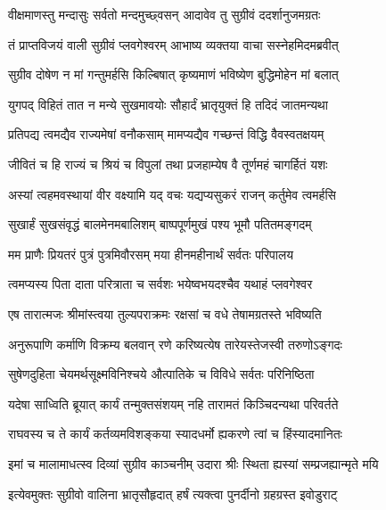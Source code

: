 
\twolineshloka
{वीक्षमाणस्तु मन्दासुः सर्वतो मन्दमुच्छ्वसन्}
{आदावेव तु सुग्रीवं ददर्शानुजमग्रतः} %

\twolineshloka
{तं प्राप्तविजयं वाली सुग्रीवं प्लवगेश्वरम्}
{आभाष्य व्यक्तया वाचा सस्नेहमिदमब्रवीत्} %

\twolineshloka
{सुग्रीव दोषेण न मां गन्तुमर्हसि किल्बिषात्}
{कृष्यमाणं भविष्येण बुद्धिमोहेन मां बलात्} %

\twolineshloka
{युगपद् विहितं तात न मन्ये सुखमावयोः}
{सौहार्दं भ्रातृयुक्तं हि तदिदं जातमन्यथा} %

\twolineshloka
{प्रतिपद्य त्वमद्यैव राज्यमेषां वनौकसाम्}
{मामप्यद्यैव गच्छन्तं विद्धि वैवस्वतक्षयम्} %

\twolineshloka
{जीवितं च हि राज्यं च श्रियं च विपुलां तथा}
{प्रजहाम्येष वै तूर्णमहं चागर्हितं यशः} %

\twolineshloka
{अस्यां त्वहमवस्थायां वीर वक्ष्यामि यद् वचः}
{यद्यप्यसुकरं राजन् कर्तुमेव त्वमर्हसि} %

\twolineshloka
{सुखार्हं सुखसंवृद्धं बालमेनमबालिशम्}
{बाष्पपूर्णमुखं पश्य भूमौ पतितमङ्गदम्} %

\twolineshloka
{मम प्राणैः प्रियतरं पुत्रं पुत्रमिवौरसम्}
{मया हीनमहीनार्थं सर्वतः परिपालय} %

\twolineshloka
{त्वमप्यस्य पिता दाता परित्राता च सर्वशः}
{भयेष्वभयदश्चैव यथाहं प्लवगेश्वर} %

\twolineshloka
{एष तारात्मजः श्रीमांस्त्वया तुल्यपराक्रमः}
{रक्षसां च वधे तेषामग्रतस्ते भविष्यति} %

\twolineshloka
{अनुरूपाणि कर्माणि विक्रम्य बलवान् रणे}
{करिष्यत्येष तारेयस्तेजस्वी तरुणोऽङ्गदः} %

\twolineshloka
{सुषेणदुहिता चेयमर्थसूक्ष्मविनिश्चये}
{औत्पातिके च विविधे सर्वतः परिनिष्ठिता} %

\twolineshloka
{यदेषा साध्विति ब्रूयात् कार्यं तन्मुक्तसंशयम्}
{नहि तारामतं किञ्चिदन्यथा परिवर्तते} %

\twolineshloka
{राघवस्य च ते कार्यं कर्तव्यमविशङ्कया}
{स्यादधर्मो ह्यकरणे त्वां च हिंस्यादमानितः} %

\twolineshloka
{इमां च मालामाधत्स्व दिव्यां सुग्रीव काञ्चनीम्}
{उदारा श्रीः स्थिता ह्यस्यां सम्प्रजह्यान्मृते मयि} %

\twolineshloka
{इत्येवमुक्तः सुग्रीवो वालिना भ्रातृसौहृदात्}
{हर्षं त्यक्त्वा पुनर्दीनो ग्रहग्रस्त इवोडुराट्} %

